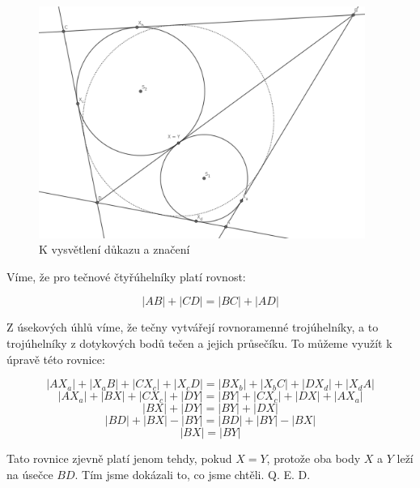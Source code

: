 \documentclass{fkssolpub}
\author{Ondřej Sedláček}
\begin{document}
\begin{figure}[h!]
  \begin{center}
    \includegraphics[width=0.95\textwidth]{3-fig.png}
  \end{center}
  \caption{K vysvětlení důkazu a značení}\label{fig:}
\end{figure}


Víme, že pro tečnové čtyřúhelníky platí rovnost:

\[
  |AB| + |CD| = |BC| + |AD|
\]

Z úsekových úhlů víme, že tečny vytvářejí rovnoramenné trojúhelníky, a to trojúhelníky z dotykových bodů tečen a jejich průsečíku. To můžeme využít k úpravě této rovnice:

\[
  |AX_a| + |X_aB| + |CX_c| + |X_cD| = |BX_b| + |X_bC| + |DX_d| + |X_dA|
\]
\[
  |AX_a| + |BX| + |CX_c| + |DY| = |BY| + |CX_c| + |DX| + |AX_a|
\]
\[
  |BX| + |DY| = |BY| + |DX|
\]
\[
  |BD| + |BX| - |BY| = |BD| + |BY| - |BX|
\]
\[
  |BX| = |BY|
\]

Tato rovnice zjevně platí jenom tehdy, pokud $X = Y$, protože oba body $X$ a $Y$ leží na úsečce $BD$. Tím jsme dokázali to, co jsme chtěli. Q. E. D.
\end{document}
